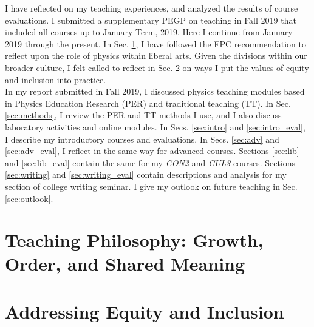 \documentclass[../../main.tex]{subfiles}
\begin{document}
\label{sec:teaching}

I have reflected on my teaching experiences, and analyzed the results of course evaluations.  I submitted a supplementary PEGP on teaching in Fall 2019 that included all courses up to January Term, 2019.  Here I continue from January 2019 through the present.  In Sec. \ref{sec:teaching_philosophy}, I have followed the FPC recommendation to reflect upon the role of physics within liberal arts.  Given the divisions within our broader culture, I felt called to reflect in Sec. \ref{sec:equity_inclusion} on ways I put the values of equity and inclusion into practice.
\\
\vspace{0.25cm}
In my report submitted in Fall 2019, I discussed physics teaching modules based in Physics Education Research (PER) and traditional teaching (TT).  In Sec. \ref{sec:methods}, I review the PER and TT methods I use, and I also discuss laboratory activities and online modules.  In Secs. \ref{sec:intro} and \ref{sec:intro_eval}, I describe my introductory courses and evaluations.  In Secs. \ref{sec:adv} and \ref{sec:adv_eval}, I reflect in the same way for advanced courses.  Sections \ref{sec:lib} and \ref{sec:lib_eval} contain the same for my \textit{CON2} and \textit{CUL3} courses.  Sections \ref{sec:writing} and \ref{sec:writing_eval} contain descriptions and analysis for my section of college writing seminar.  I give my outlook on future teaching in Sec. \ref{sec:outlook}.

\section{Teaching Philosophy: Growth, Order, and Shared Meaning}
\label{sec:teaching_philosophy}

%

\begin{flushleft}

\end{flushleft}

\section{Addressing Equity and Inclusion}
\label{sec:equity_inclusion}

%
\end{document}
